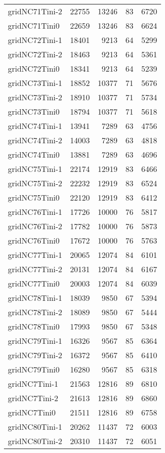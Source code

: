 \begin{longtable}{lrrrr}
gridNC71Tini-2 & 22755 & 13246 & 83 & 6720 \\
gridNC71Tini0 & 22659 & 13246 & 83 & 6624 \\
gridNC72Tini-1 & 18401 & 9213 & 64 & 5299 \\
gridNC72Tini-2 & 18463 & 9213 & 64 & 5361 \\
gridNC72Tini0 & 18341 & 9213 & 64 & 5239 \\
gridNC73Tini-1 & 18852 & 10377 & 71 & 5676 \\
gridNC73Tini-2 & 18910 & 10377 & 71 & 5734 \\
gridNC73Tini0 & 18794 & 10377 & 71 & 5618 \\
gridNC74Tini-1 & 13941 & 7289 & 63 & 4756 \\
gridNC74Tini-2 & 14003 & 7289 & 63 & 4818 \\
gridNC74Tini0 & 13881 & 7289 & 63 & 4696 \\
gridNC75Tini-1 & 22174 & 12919 & 83 & 6466 \\
gridNC75Tini-2 & 22232 & 12919 & 83 & 6524 \\
gridNC75Tini0 & 22120 & 12919 & 83 & 6412 \\
gridNC76Tini-1 & 17726 & 10000 & 76 & 5817 \\
gridNC76Tini-2 & 17782 & 10000 & 76 & 5873 \\
gridNC76Tini0 & 17672 & 10000 & 76 & 5763 \\
gridNC77Tini-1 & 20065 & 12074 & 84 & 6101 \\
gridNC77Tini-2 & 20131 & 12074 & 84 & 6167 \\
gridNC77Tini0 & 20003 & 12074 & 84 & 6039 \\
gridNC78Tini-1 & 18039 & 9850 & 67 & 5394 \\
gridNC78Tini-2 & 18089 & 9850 & 67 & 5444 \\
gridNC78Tini0 & 17993 & 9850 & 67 & 5348 \\
gridNC79Tini-1 & 16326 & 9567 & 85 & 6364 \\
gridNC79Tini-2 & 16372 & 9567 & 85 & 6410 \\
gridNC79Tini0 & 16280 & 9567 & 85 & 6318 \\
gridNC7Tini-1 & 21563 & 12816 & 89 & 6810 \\
gridNC7Tini-2 & 21613 & 12816 & 89 & 6860 \\
gridNC7Tini0 & 21511 & 12816 & 89 & 6758 \\
gridNC80Tini-1 & 20262 & 11437 & 72 & 6003 \\
gridNC80Tini-2 & 20310 & 11437 & 72 & 6051 \\

\end{longtable}
